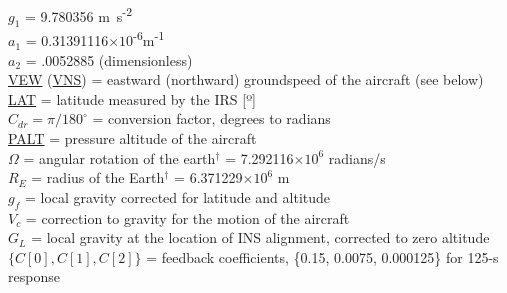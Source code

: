 \documentclass[
]{book}
\begin{document}
\(g_{1}\) = 9.780356 m~s\textsuperscript{-2}\\
\(a_{1}\) = 0.31391116\(\times 10\)\textsuperscript{-6}m\textsuperscript{-1}\\
\(a_{2}\) = .0052885 (dimensionless)\\
\protect\hyperlink{vew}{VEW} (\protect\hyperlink{vns}{VNS}) = eastward (northward) groundspeed of the aircraft (see
below)\\
\protect\hyperlink{latitude}{LAT} = latitude measured by the IRS {[}º{]}\\
\(C_{dr}=\pi/180^{\circ}\) = conversion factor, degrees to radians\\
\protect\hyperlink{palt}{PALT} = pressure altitude of the aircraft\\
\(\Omega\) = angular rotation of the earth\(^{\dagger}\) = 7.292116\(\times10^{6}\)
radians/s\\
\(R_{E}\) = radius of the Earth\(^{\dagger}\) = 6.371229\(\times10^{6}\)
m\\
\(g_{f}\) = local gravity corrected for latitude and altitude\\
\(V_{c}\) = correction to gravity for the motion of the aircraft\\
\(G_{L}\) = local gravity at the location of INS alignment, corrected
to zero altitude\\
\(\{C[0],C[1],C[2]\}\) = feedback coefficients, \{0.15, 0.0075, 0.000125\}
for 125-s response
\end{document}
